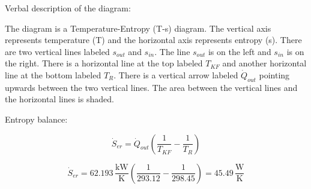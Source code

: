 Verbal description of the diagram:

The diagram is a Temperature-Entropy (T-s) diagram. The vertical axis represents temperature (T) and the horizontal axis represents entropy (s). There are two vertical lines labeled \( s_{out} \) and \( s_{in} \). The line \( s_{out} \) is on the left and \( s_{in} \) is on the right. There is a horizontal line at the top labeled \( T_{KF} \) and another horizontal line at the bottom labeled \( T_R \). There is a vertical arrow labeled \( \dot{Q}_{out} \) pointing upwards between the two vertical lines. The area between the vertical lines and the horizontal lines is shaded.

Entropy balance:

\[
\dot{S}_{er} = \dot{Q}_{out} \left( \frac{1}{T_{KF}} - \frac{1}{T_R} \right)
\]

\[
\dot{S}_{er} = 62.193 \, \frac{\text{kW}}{\text{K}} \left( \frac{1}{293.12} - \frac{1}{298.45} \right) = 45.49 \, \frac{\text{W}}{\text{K}}
\]